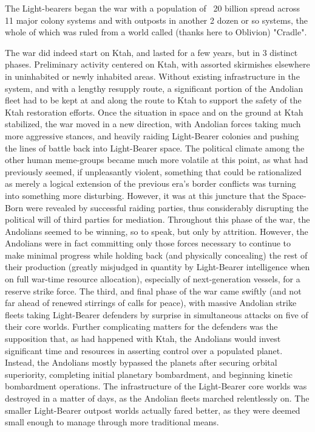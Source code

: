 The Light-bearers began the war with a population of ~20 billion
spread across 11 major colony systems and with outposts in another 2
dozen or so systems, the whole of which was ruled from a world called
(thanks here to Oblivion) "Cradle".

The war did indeed start on Ktah, and lasted for a few years, but in 3
distinct phases. Preliminary activity centered on Ktah, with assorted
skirmishes elsewhere in uninhabited or newly inhabited areas. Without
existing infrastructure in the system, and with a lengthy resupply
route, a significant portion of the Andolian fleet had to be kept at
and along the route to Ktah to support the safety of the Ktah
restoration efforts. Once the situation in space and on the ground at
Ktah stabilized, the war moved in a new direction, with Andolian
forces taking much more aggressive stances, and heavily raiding
Light-Bearer colonies and pushing the lines of battle back into
Light-Bearer space. The political climate among the other human
meme-groups became much more volatile at this point, as what had
previously seemed, if unpleasantly violent, something that could be
rationalized as merely a logical extension of the previous era's
border conflicts was turning into something more disturbing. However,
it was at this juncture that the Space-Born were revealed by
successful raiding parties, thus considerably disrupting the political
will of third parties for mediation. Throughout this phase of the war,
the Andolians seemed to be winning, so to speak, but only by
attrition. However, the Andolians were in fact committing only those
forces necessary to continue to make minimal progress while holding
back (and physically concealing) the rest of their production (greatly
misjudged in quantity by Light-Bearer intelligence when on full
war-time resource allocation), especially of next-generation vessels,
for a reserve strike force. The third, and final phase of the war came
swiftly (and not far ahead of renewed stirrings of calls for peace),
with massive Andolian strike fleets taking Light-Bearer defenders by
surprise in simultaneous attacks on five of their core worlds. Further
complicating matters for the defenders was the supposition that, as
had happened with Ktah, the Andolians would invest significant time
and resources in asserting control over a populated planet. Instead,
the Andolians mostly bypassed the planets after securing orbital
superiority, completing initial planetary bombardment, and beginning
kinetic bombardment operations. The infrastructure of the Light-Bearer
core worlds was destroyed in a matter of days, as the Andolian fleets
marched relentlessly on. The smaller Light-Bearer outpost worlds
actually fared better, as they were deemed small enough to manage
through more traditional means.

